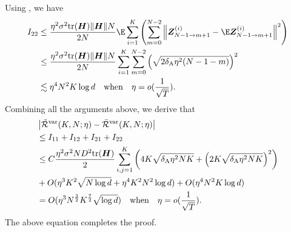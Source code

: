 Using , we have
\begin{align*}    
    I_{22}&\leq \frac{\eta^2\sigma^2\text{tr}(\mH)\|\mH\|N}{2N}\E\sum_{i=1}^K\left(\sum_{m=0}^{N-2}\left\|\mZ_{N-1 \to m+1}^{(i)}-\E\mZ_{N-1 \to m+1}^{(i)}\right\|^2\right) \\
    &\leq \frac{\eta^2\sigma^2\text{tr}(\mH)\|\mH\|N}{2N}\sum_{i=1}^K\sum_{m=0}^{N-2}\left(\sqrt{2\deltaA\eta^2(N-1-m)}\right)^2 \\
    &\lesssim \eta^4N^2K\log d ~~~\text{when} ~~~\eta = o(\frac{1}{\sqrt{T}}).
\end{align*}
Combining all the arguments above, we derive that
\begin{align*}
    &\left|\Tilde{\mathcal{R}}^{\mathrm{var}}(K,N;\eta) - \bar{\mathcal{R}}^{\mathrm{var}}(K,N;\eta)\right| \\
    &\leq I_{11}+I_{12}+I_{21}+I_{22} \\
    &\leq C\frac{\eta^2\sigma^2ND^2\text{tr}({\bm{H}})}{2}\sum_{\substack{i,j=1}}^K\left(4K\sqrt{\delta_{\mathrm{A}}\eta^2NK}+\left(2K\sqrt{\delta_{\mathrm{A}}\eta^2NK}\right)^2\right) \\
    &+O(\eta^3K^2\sqrt{N\log d}+\eta^4K^2N^2\log d)+O(\eta^4N^2K\log d) \\
    &= O(\eta^3N^\frac{3}{2}K^{\frac{7}{2}}\sqrt{\log d}) ~~~\text{when} ~~~\eta = o(\frac{1}{\sqrt{T}}).
\end{align*}
The above equation completes the proof.
